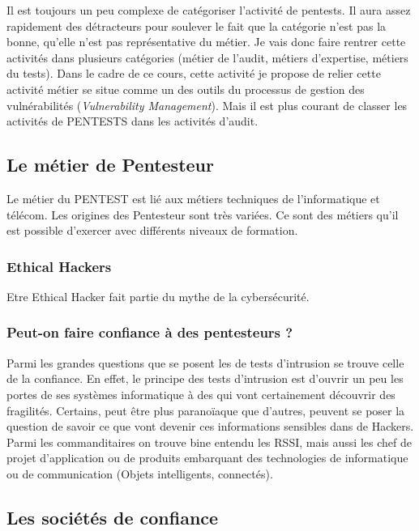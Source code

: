 Il est toujours un peu complexe de catégoriser l'activité de pentests. Il aura assez rapidement des détracteurs pour soulever le fait que la catégorie n'est pas la bonne, qu'elle n'est pas représentative du métier. 
Je vais donc faire rentrer cette activités dans plusieurs catégories (métier de l'audit, métiers d'expertise, métiers du tests).
Dans le cadre de ce cours, cette activité je propose de relier cette activité métier se situe comme un des outils du processus de gestion des vulnérabilités (\emph{Vulnerability Management}).  Mais il est plus courant de  classer les activités de PENTESTS dans les activités d'audit.

\subsection{Le métier de Pentesteur}

Le métier du PENTEST est  lié aux métiers techniques de l'informatique et télécom. Les origines des Pentesteur sont très variées.
Ce sont des métiers qu'il est possible d'exercer avec différents niveaux de formation. 

\subsubsection{ Ethical Hackers}
Etre Ethical Hacker fait partie du mythe de la cybersécurité.

\subsubsection{Peut-on faire confiance à des pentesteurs ?}
Parmi les grandes questions que se posent les  de tests d'intrusion se trouve celle de la confiance.
En effet, le principe des tests d'intrusion est d'ouvrir un peu les portes de ses systèmes informatique à des  qui vont certainement découvrir des fragilités.
Certains, peut être plus paranoïaque que d'autres, peuvent se poser la question de savoir ce que vont devenir ces informations sensibles dans  de Hackers.
Parmi les commanditaires on trouve bine entendu les RSSI, mais aussi les chef de projet d'application ou de produits embarquant des technologies de informatique ou de communication (Objets intelligents, connectés).

\subsection{Les sociétés de confiance}


